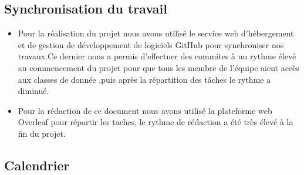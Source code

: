 \begin{center}
\def\angle{0}
\def\radius{3}
\def\cyclelist{{"orange","blue","red","green"}}
\newcount\cyclecount {}
\newcount\ind {}
\end{center}

\subsection{Synchronisation du travail}
\begin{itemize}
\item Pour la réalisation du projet nous avons utilisé le service web d'hébergement et de gestion de développement de logiciels GitHub pour synchroniser nos travaux.Ce dernier nous a permis d’effectuer des commites à un rythme élevé au commencement du projet pour que tous les membre de l'équipe aient accès aux classes de donnée ,puis après la répartition des tâches le rythme a diminué.
\item Pour la rédaction de ce document nous avons utilisé la plateforme web Overleaf pour répartir les taches, le rythme de rédaction a été très élevé à la fin du projet. 
\end{itemize}

\clearpage
\subsection{Calendrier}
